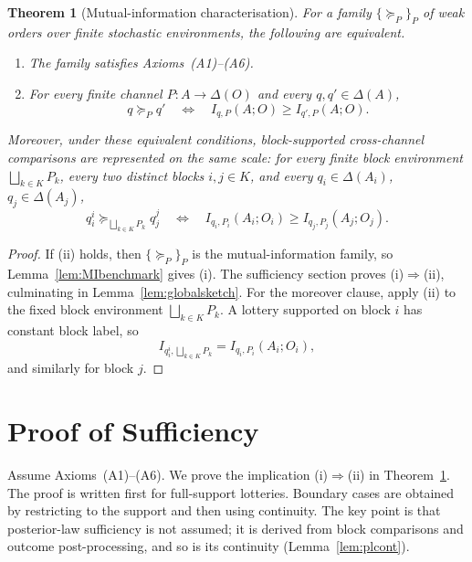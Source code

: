 \documentclass[11pt,a4paper]{article}
\newtheorem{theorem}{Theorem}
\theoremstyle{definition}
\newcommand{\1}{\mathbf 1}
\begin{document}
\begin{theorem}[Mutual-information characterisation]\label{thm:main}
For a family $\{\succeq_P\}_P$ of weak orders over finite stochastic environments, the following are equivalent.
\begin{enumerate}[label=\textup{(\roman*)},leftmargin=*]
\item The family satisfies Axioms~\textup{(A1)--(A6)}.
\item For every finite channel $P:A\to\Delta(O)$ and every $q,q'\in\Delta(A)$,
\[
q\succeq_P q'
\quad\Longleftrightarrow\quad
I_{q,P}(A;O)\ge I_{q',P}(A;O).
\]
\end{enumerate}
Moreover, under these equivalent conditions, block-supported cross-channel comparisons are represented on the same
scale: for every finite block environment $\bigsqcup_{k\in K}P_k$, every two distinct blocks $i,j\in K$, and every
$q_i\in\Delta(A_i)$, $q_j\in\Delta(A_j)$,
\[
q_i^i\succeq_{\bigsqcup_{k\in K}P_k}q_j^j
\quad\Longleftrightarrow\quad
I_{q_i,P_i}(A_i;O_i)\ge I_{q_j,P_j}(A_j;O_j).
\]
\end{theorem}

\begin{proof}
If \textup{(ii)} holds, then $\{\succeq_P\}_P$ is the mutual-information family, so
Lemma~\ref{lem:MIbenchmark} gives \textup{(i)}.  The sufficiency section proves \textup{(i)$\Rightarrow$(ii)},
culminating in Lemma~\ref{lem:globalsketch}.  For the moreover clause, apply
\textup{(ii)} to the fixed block environment $\bigsqcup_{k\in K}P_k$.  A lottery supported on block $i$ has constant
block label, so
\[
I_{q_i^i,\bigsqcup_{k\in K}P_k}=I_{q_i,P_i}(A_i;O_i),
\]
and similarly for block $j$.
\end{proof}

\section*{Proof of Sufficiency}

Assume Axioms~\textup{(A1)--(A6)}.  We prove the implication \textup{(i)$\Rightarrow$(ii)} in
Theorem~\ref{thm:main}.  The proof is written first for full-support lotteries.  Boundary cases are obtained by
restricting to the support and then using continuity.  The key point is that posterior-law sufficiency is not assumed; it
is derived from block comparisons and outcome post-processing, and so is its continuity
(Lemma~\ref{lem:plcont}).
\end{document}
